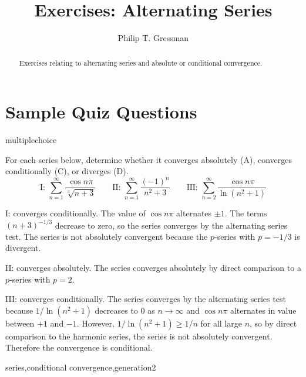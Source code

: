 \documentclass{ximera}
\title{Exercises: Alternating Series}
\author{Philip T. Gressman}
\begin{document}
\begin{abstract}
Exercises relating to alternating series and absolute or conditional convergence.
\end{abstract}
\maketitle


\section*{Sample Quiz Questions}

\begin{question}[seriesacd001]
\begin{type}
multiplechoice
\end{type}
For each series below, determine whether it converges absolutely (A), converges conditionally (C), or diverges (D).  \[\text{I: } \sum_{n = 1}^\infty\frac{\cos n \pi}{\sqrt[3]{n+3}} \qquad \text{II: } \sum_{n = 1}^\infty\frac{(-1)^n}{n^2+3} \qquad \text{III: } \sum_{n = 2}^\infty\frac{\cos n \pi}{\ln (n^2 + 1)}\]
\begin{multiplechoice}
 \choicebreak
{}
\end{multiplechoice}
\begin{feedback}
I: converges conditionally. The value of \(\cos n \pi\) alternates \(\pm 1\). The terms \((n+3)^{-1/3}\) decrease to zero, so the series converges by the alternating series test. The series is not absolutely convergent because the \(p\)-series with \(p = -1/3\) is divergent.

II: converges absolutely. The series converges absolutely by direct comparison to a \(p\)-series with \(p=2\).

III: converges conditionally. The series converges by the alternating series test because \(1/\ln (n^2+1)\) decreases to \(0\) as \(n \rightarrow \infty\) and \(\cos n \pi\) alternates in value between \(+1\) and \(-1\). However, \(1/\ln (n^2+1) \geq 1/n\) for all large \(n\), so by direct comparison to the harmonic series, the series is not absolutely convergent. Therefore the convergence is conditional.
\end{feedback}
\begin{keywords}
series,conditional convergence,generation2
\end{keywords}
\end{question}
\end{document}
